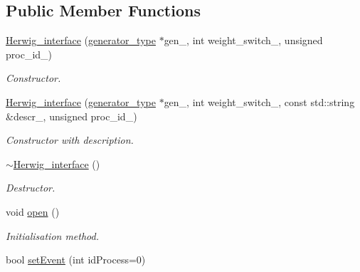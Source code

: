 \subsection*{Public Member Functions}
\begin{DoxyCompactItemize}
\item 
\hypertarget{a00279_ac7783bf83f16bd4a075a6e3cfd438edc}{\hyperlink{a00279_ac7783bf83f16bd4a075a6e3cfd438edc}{Herwig\-\_\-interface} (\hyperlink{a00442}{generator\-\_\-type} $\ast$gen\-\_\-, int weight\-\_\-switch\-\_\-, unsigned proc\-\_\-id\-\_)}\label{a00279_ac7783bf83f16bd4a075a6e3cfd438edc}

\begin{DoxyCompactList}\small\item\em Constructor. \end{DoxyCompactList}\item 
\hypertarget{a00279_a497fa7494387d4a28095ee407b8a458d}{\hyperlink{a00279_a497fa7494387d4a28095ee407b8a458d}{Herwig\-\_\-interface} (\hyperlink{a00442}{generator\-\_\-type} $\ast$gen\-\_\-, int weight\-\_\-switch\-\_\-, const std\-::string \&descr\-\_\-, unsigned proc\-\_\-id\-\_)}\label{a00279_a497fa7494387d4a28095ee407b8a458d}

\begin{DoxyCompactList}\small\item\em Constructor with description. \end{DoxyCompactList}\item 
\hypertarget{a00279_a100c57c8c8a36b0ddc6a05378c2977c2}{\hyperlink{a00279_a100c57c8c8a36b0ddc6a05378c2977c2}{$\sim$\-Herwig\-\_\-interface} ()}\label{a00279_a100c57c8c8a36b0ddc6a05378c2977c2}

\begin{DoxyCompactList}\small\item\em Destructor. \end{DoxyCompactList}\item 
\hypertarget{a00279_a7813e6b9a95a413999dcb25e9b447637}{void \hyperlink{a00279_a7813e6b9a95a413999dcb25e9b447637}{open} ()}\label{a00279_a7813e6b9a95a413999dcb25e9b447637}

\begin{DoxyCompactList}\small\item\em Initialisation method. \end{DoxyCompactList}\item 
\hypertarget{a00279_aadb707b92b34464fd1ff595e85d2d11a}{bool \hyperlink{a00279_aadb707b92b34464fd1ff595e85d2d11a}{set\-Event} (int id\-Process=0)}\label{a00279_aadb707b92b34464fd1ff595e85d2d11a}


\end{DoxyCompactItemize}
